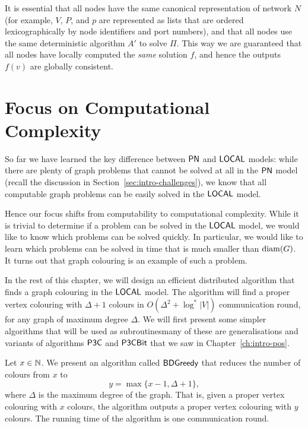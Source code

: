 It is essential that all nodes have the same canonical representation of network $N$ (for example, $V$, $P$, and $p$ are represented as lists that are ordered lexicographically by node identifiers and port numbers), and that all nodes use the same deterministic algorithm $A'$ to solve $\Pi$. This way we are guaranteed that all nodes have locally computed the \emph{same} solution $f$, and hence the outputs $f(v)$ are globally consistent.


\section{Focus on Computational Complexity}

So far we have learned the key difference between $\textup{\sffamily PN}$ and $\textup{\sffamily LOCAL}$ models: while there are plenty of graph problems that cannot be solved at all in the $\textup{\sffamily PN}$ model (recall the discussion in Section~\ref{sec:intro-challenges}), we know that all computable graph problems can be easily solved in the $\textup{\sffamily LOCAL}$ model.

Hence our focus shifts from computability to computational complexity. While it is trivial to determine if a problem can be solved in the $\textup{\sffamily LOCAL}$ model, we would like to know which problems can be solved quickly. In particular, we would like to learn which problems can be solved in time that is much smaller than $\operatorname{diam}(G)$. It turns out that graph colouring is an example of such a problem.

In the rest of this chapter, we will design an efficient distributed algorithm that finds a graph colouring in the $\textup{\sffamily LOCAL}$ model. The algorithm will find a proper vertex colouring with $\Delta+1$ colours in $O(\Delta^2 + \log^* |V|)$ communication round, for any graph of maximum degree $\Delta$. We will first present some simpler algorithms that will be used as subroutines\mydash many of these are generalisations and variants of algorithms $\textup{\sffamily P3C}$ and $\textup{\sffamily P3CBit}$ that we saw in Chapter~\ref{ch:intro-pos}.


\label{sec:bdgreedy}

Let $x \in \mathbb{N}$. We present an algorithm called $\textup{\sffamily BDGreedy}$ that reduces the number of colours from $x$ to
\[
    y = \max \{ x-1, \Delta+1 \},
\]
where $\Delta$ is the maximum degree of the graph. That is, given a proper vertex colouring with $x$ colours, the algorithm outputs a proper vertex colouring with $y$ colours. The running time of the algorithm is one communication round.

